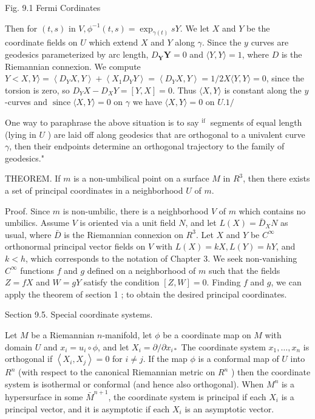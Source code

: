 \documentclass[10pt]{article}
\begin{document}
Fig. 9.1 Fermi Cordinates

Then for $(t, s)$ in $V, \phi^{-1}(t, s)=\exp _{\gamma(t)} s Y$. We let $X$ and $Y$ be the coordinate fields on $U$ which extend $X$ and $Y$ along $\gamma$. Since the $y$ curves are geodesics parameterized by arc length, $D_{\boldsymbol{Y}} \boldsymbol{Y}=0$ and $\langle Y, Y\rangle=1$, where $D$ is the Riemannian connexion. We compute $Y<X, Y\rangle=\left\langle D_{Y} X, Y\right\rangle+\left\langle X_{1} D_{Y} Y\right\rangle=\left\langle D_{Y} X, Y\right\rangle=1 / 2 X\langle Y, Y\rangle=0$, since the torsion is zero, so $D_{Y} X-D_{X} Y=[Y, X]=0$. Thus $\langle X, Y\rangle$ is constant along the $y$-curves and $\operatorname{since}\langle X, Y\rangle=0$ on $\gamma$ we have $\langle X, Y\rangle=0$ on $U .1 /$

One way to paraphrase the above situation is to say ${ }^{\text {if }}$ segments of equal length (lying in $U$ ) are laid off along geodesics that are orthogonal to a univalent curve $\gamma$, then their endpoints determine an orthogonal trajectory to the family of geodesics."

THEOREM. If $m$ is a non-umbilical point on a surface $M$ in $R^{3}$, then there exists a set of principal coordinates in a neighborhood $U$ of $m .$

Proof. Since $m$ is non-umbilic, there is a neighborhood $V$ of $m$ which contains no umbilics. Assume $V$ is oriented via a unit field $N$, and let $L(X)=\bar{D}_{X} N$ as usual, where $\bar{D}$ is the Riemannian connexion on $R^{3}$. Let $X$ and $Y$ be $C^{\infty}$ orthonormal principal vector fields on $V$ with $L(X)=k X, L(Y)=h Y$, and $k<h$, which corresponds to the notation of Chapter 3. We seek non-vanishing $C^{\infty}$ functions $f$ and $g$ defined on a neighborhood of $m$ such that the fields $Z=f X$ and $W=g Y$ satisfy the condition $[Z, W]=0 .$ Finding $f$ and $g$, we can apply the theorem of section 1 ; to obtain the desired principal coordinates.

Section 9.5. Special coordinate systems.

Let $M$ be a Riemannian $n$-manifold, let $\phi$ be a coordinate map on $M$ with domain $U$ and $x_{i}=u_{i} \circ \phi$, and let $X_{i}=\partial / \partial x_{i *}$ The coordinate system $x_{1}, \ldots, x_{n}$ is orthogonal if $\left\langle X_{i}, X_{j}\right\rangle=0$ for $i \neq j$. If the map $\phi$ is a conformal map of $U$ into $R^{n}$ (with respect to the canonical Riemannian metric on $R^{n}$ ) then the coordinate system is isothermal or conformal (and hence also orthogonal). When $M^{n}$ is a hypersurface in some $\bar{M}^{n+1}$, the coordinate system is principal if each $X_{i}$ is a principal vector, and it is asymptotic if each $X_{i}$ is an asymptotic vector.
\end{document}
